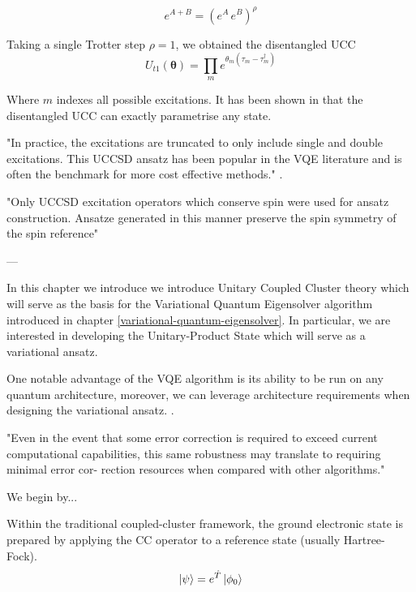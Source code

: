 \begin{equation*}
    e^{A+B} = (e^A \, e^B)^\rho
\end{equation*}

Taking a single Trotter step $\rho=1$, we obtained the disentangled UCC
\begin{equation}
    U_{t1}(\mathbf\theta) = \prod_m e^{\theta_m (\tau_m - \tau_m^\dagger)}
\end{equation}

Where $m$ indexes all possible excitations. It has been shown in \cite{Evangelista2019} that the disentangled UCC can exactly parametrise any state.

"In practice, the excitations are truncated to only include single and double excitations. This UCCSD ansatz has been popular in the VQE literature and is often the benchmark for more cost effective methods." \cite{Chan2021}.

"Only UCCSD excitation operators which conserve spin were
used for ansatz construction. Ansatze generated in this manner
preserve the spin symmetry of the spin reference" \cite{Chan2021}

---

In this chapter we introduce we introduce Unitary Coupled Cluster theory which will serve as the basis for the Variational Quantum Eigensolver algorithm introduced in chapter \ref{variational-quantum-eigensolver}. In particular, we are interested in developing the Unitary-Product State which will serve as a variational ansatz.



One notable advantage of the VQE algorithm is its ability to be run on any quantum architecture, moreover, we can leverage architecture requirements when designing the variational ansatz. \cite{McClean2016}.

"Even in the event that some error correction is required to exceed current computational capabilities, this same robustness may translate to requiring minimal error cor- rection resources when compared with other algorithms." \cite{McClean2016}

We begin by...



Within the traditional coupled-cluster framework, the ground electronic state is prepared by applying the CC operator to a reference state (usually Hartree-Fock).
\begin{equation*}
    \ket\psi = e^{\hat T} \ket{\phi_0}
\end{equation*}

